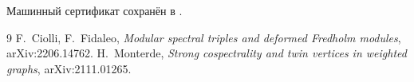 Машинный сертификат сохранён в
.

\begin{thebibliography}{9}
F.~Ciolli, F.~Fidaleo,
\emph{Modular spectral triples and deformed Fredholm modules},
arXiv:2206.14762.
H.~Monterde,
\emph{Strong cospectrality and twin vertices in weighted graphs},
arXiv:2111.01265.
\end{thebibliography}